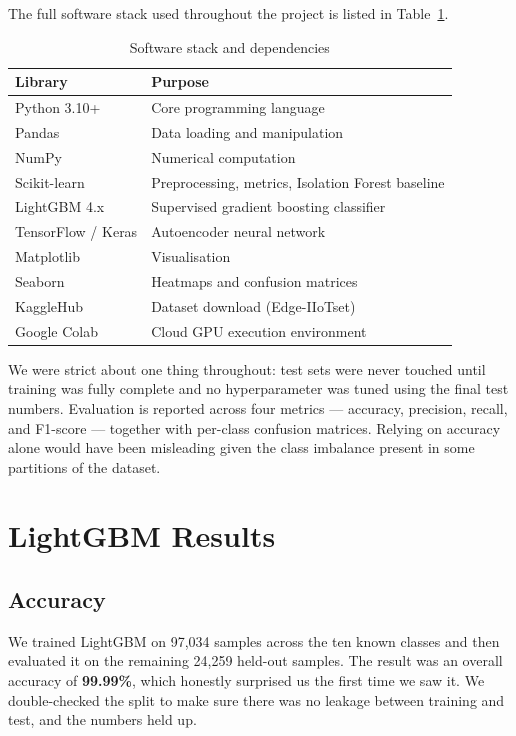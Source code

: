 \documentclass[12pt,a4paper]{report}
\begin{document}
\noindent The full software stack used throughout the project is listed in
Table~\ref{tab:software}.

\begin{table}[H]
\centering
\caption{Software stack and dependencies}
\label{tab:software}
\begin{tabular}{ll}
\toprule
\textbf{Library} & \textbf{Purpose} \\
\midrule
Python 3.10+       & Core programming language \\
Pandas             & Data loading and manipulation \\
NumPy              & Numerical computation \\
Scikit-learn       & Preprocessing, metrics, Isolation Forest baseline \\
LightGBM 4.x       & Supervised gradient boosting classifier \\
TensorFlow / Keras & Autoencoder neural network \\
Matplotlib         & Visualisation \\
Seaborn            & Heatmaps and confusion matrices \\
KaggleHub          & Dataset download (Edge-IIoTset) \\
Google Colab       & Cloud GPU execution environment \\
\bottomrule
\end{tabular}
\end{table}

\noindent We were strict about one thing throughout: test sets were never
touched until training was fully complete and no hyperparameter was tuned
using the final test numbers. Evaluation is reported across four metrics ---
accuracy, precision, recall, and F1-score --- together with per-class confusion
matrices. Relying on accuracy alone would have been misleading given the class
imbalance present in some partitions of the dataset.

\section{LightGBM Results}

\subsection{Accuracy}

We trained LightGBM on 97,034 samples across the ten known classes and then
evaluated it on the remaining 24,259 held-out samples. The result was an
overall accuracy of \textbf{99.99\%}, which honestly surprised us the first
time we saw it. We double-checked the split to make sure there was no leakage
between training and test, and the numbers held up.
\end{document}
